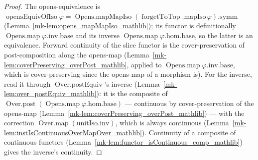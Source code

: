 \begin{proof}
  The opens-equivalence is \(\operatorname{opensEquivOfIso}\varphi = \operatorname{Opens.mapMapIso}
  (\operatorname{forgetToTop}.\mathrm{mapIso}\,\varphi).\mathrm{symm}\)
  (Lemma~\ref{mk-lem:opens_mapMapIso_mathlib}); its functor is definitionally
  \(\operatorname{Opens.map}\varphi.\mathrm{inv}.\mathrm{base}\) and its inverse
  \(\operatorname{Opens.map}\varphi.\mathrm{hom}.\mathrm{base}\), so the latter is an equivalence.
  Forward continuity of the slice functor is the cover-preservation of post-composition along the
  opens-map (Lemma~\ref{mk-lem:coverPreserving_overPost_mathlib}, applied to
  \(\operatorname{Opens.map}\varphi.\mathrm{inv}.\mathrm{base}\), which is cover-preserving since the
  opens-map of a morphism is). For the inverse, read it through \(\operatorname{Over.postEquiv}\)'s
  inverse (Lemma~\ref{mk-lem:over_postEquiv_mathlib}): it is the composite of
  \(\operatorname{Over.post}(\operatorname{Opens.map}\varphi.\mathrm{hom}.\mathrm{base})\) --- continuous
  by cover-preservation of the opens-map (Lemma~\ref{mk-lem:coverPreserving_overPost_mathlib}) --- with the
  correction \(\operatorname{Over.map}(\mathrm{unitIso}.\mathrm{inv})\), which is always continuous
  (Lemma~\ref{mk-lem:instIsContinuousOverMapOver_mathlib}). Continuity of a composite of continuous
  functors (Lemma~\ref{mk-lem:functor_isContinuous_comp_mathlib}) gives the inverse's continuity.
\end{proof}

